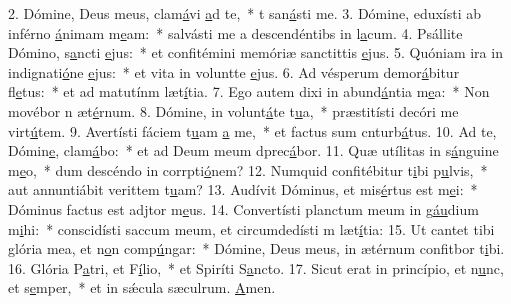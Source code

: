 2. Dómine, Deus meus, clam\uline{á}vi \uline{a}d te,~* t san\uline{á}sti me.
3. Dómine, eduxísti ab inférno \uline{á}nimam m\uline{e}am:~* salvásti me a descendéntibs in l\uline{a}cum.
4. Psállite Dómino, s\uline{a}ncti \uline{e}jus:~* et confitémini memóriæ sanctittis \uline{e}jus.
5. Quóniam ira in indignati\uline{ó}ne \uline{e}jus:~* et vita in voluntte \uline{e}jus.
6. Ad vésperum demor\uline{á}bitur fl\uline{e}tus:~* et ad matutínm læt\uline{í}tia.
7. Ego autem dixi in abund\uline{á}ntia m\uline{e}a:~* Non movébor n æt\uline{é}rnum.
8. Dómine, in volunt\uline{á}te t\uline{u}a,~* præstitísti decóri me virt\uline{ú}tem.
9. Avertísti fáciem t\uline{u}am \uline{a} me,~* et factus sum cnturb\uline{á}tus.
10. Ad te, Dómin\uline{e}, clam\uline{á}bo:~* et ad Deum meum dprec\uline{á}bor.
11. Quæ utílitas in s\uline{á}nguine m\uline{e}o,~* dum descéndo in corrpti\uline{ó}nem?
12. Numquid confitébitur t\uline{i}bi p\uline{u}lvis,~* aut annuntiábit verittem t\uline{u}am?
13. Audívit Dóminus, et mis\uline{é}rtus est m\uline{e}i:~* Dóminus factus est adjtor m\uline{e}us.
14. Convertísti planctum meum in g\uline{áu}dium m\uline{i}hi:~* conscidísti saccum meum, et circumdedísti m læt\uline{í}tia:
15. Ut cantet tibi glória mea, et n\uline{o}n comp\uline{ú}ngar:~* Dómine, Deus meus, in ætérnum confitbor t\uline{i}bi.
16. Glória P\uline{a}tri, et F\uline{í}lio,~* et Spiríti S\uline{a}ncto.
17. Sicut erat in princípio, et n\uline{u}nc, et s\uline{e}mper,~* et in sǽcula sæculrum. \uline{A}men.
